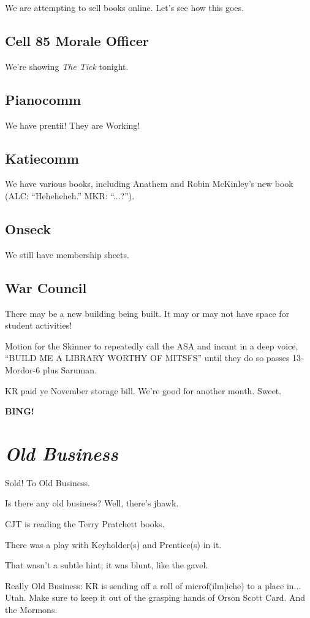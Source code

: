 \documentclass[10pt]{article}
\newcommand{\bing}{{\bf BING!} }
\newcommand{\goto}[1]{\bing \vskip 12pt \section*{{\em{#1}}}}
\begin{document}
We are attempting to sell books online.  Let's see how this goes.

\subsection*{Cell 85 Morale Officer}

We're showing \emph{The Tick} tonight.

\subsection*{Pianocomm}

We have prentii!  They are Working!

\subsection*{Katiecomm}

We have various books, including Anathem and Robin McKinley's new book
(ALC: ``Heheheheh.'' MKR: ``...?'').

\subsection*{Onseck}

We still have membership sheets.

\subsection*{War Council}

There may be a new building being built.  It may or may not have space
for student activities!

Motion for the Skinner to repeatedly call the ASA and incant in a deep
voice, ``BUILD ME A LIBRARY WORTHY OF MITSFS'' until they do so passes
13-Mordor-6 plus Saruman.

KR paid ye November storage bill.  We're good for another month.
Sweet.

\goto{Old Business}

Sold!  To Old Business.

Is there any old business?  Well, there's jhawk.

CJT is reading the Terry Pratchett books.

There was a play with Keyholder(s) and Prentice(s) in it.

That wasn't a subtle hint; it was blunt, like the gavel.

Really Old Business: KR is sending off a roll of microf(ilm|iche) to a
place in... Utah.  Make sure to keep it out of the grasping hands of
Orson Scott Card.  And the Mormons.
\end{document}

